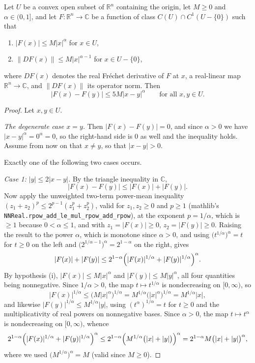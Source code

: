 \begin{lemma}
Let $U$ be a convex open subset of $\mathbb{R}^n$ containing the origin, let
$M\ge0$ and $\alpha\in(0,1]$, and let $F\colon\mathbb{R}^n\to\mathbb{C}$ be a
function of class $C(U)\cap C^1(U-\{0\})$ such that
\begin{enumerate}
\item[(i)] $|F(x)|\le M|x|^\alpha$ for $x\in U$,
\item[(ii)] $\|DF(x)\|\le M|x|^{\alpha-1}$ for $x\in U-\{0\}$,
\end{enumerate}
where $DF(x)$ denotes the real Fr\'echet derivative of $F$ at $x$, a
real-linear map $\mathbb{R}^n\to\mathbb{C}$, and $\|DF(x)\|$ its operator
norm.  Then
\[
  |F(x)-F(y)|\le5M|x-y|^\alpha\qquad\text{for all }x,y\in U .
\]
\end{lemma}
\begin{proof}
Let $x,y\in U$.

\emph{The degenerate case $x=y$.}  Then $|F(x)-F(y)|=0$, and since
$\alpha>0$ we have $|x-y|^\alpha=0^\alpha=0$, so the right-hand side is
$0$ as well and the inequality holds.  Assume from now on that $x\neq y$, so
that $|x-y|>0$.

Exactly one of the following two cases occurs.

\emph{Case 1: $|y|\le2|x-y|$.}  By the triangle inequality in $\mathbb{C}$,
\[
  |F(x)-F(y)|\le|F(x)|+|F(y)| .
\]
Now apply the unweighted two-term power-mean inequality
$(z_1+z_2)^{p}\le2^{p-1}(z_1^{p}+z_2^{p})$, valid for $z_1,z_2\ge0$ and
$p\ge1$ (mathlib's \texttt{NNReal.rpow\_add\_le\_mul\_rpow\_add\_rpow}), at the
exponent $p=1/\alpha$, which is $\ge1$ because $0<\alpha\le1$, and with
$z_1=|F(x)|\ge0$, $z_2=|F(y)|\ge0$.  Raising the result to the power $\alpha$,
which is monotone since $\alpha>0$, and using
$\bigl(t^{1/\alpha}\bigr)^{\alpha}=t$ for $t\ge0$ on the left and
$\bigl(2^{1/\alpha-1}\bigr)^{\alpha}=2^{1-\alpha}$ on the right, gives
\[
  |F(x)|+|F(y)|\le2^{1-\alpha}\Bigl(|F(x)|^{1/\alpha}+|F(y)|^{1/\alpha}\Bigr)^{\alpha}.
\]
By hypothesis (i), $|F(x)|\le M|x|^\alpha$ and $|F(y)|\le M|y|^\alpha$, all
four quantities being nonnegative.  Since $1/\alpha>0$, the map
$t\mapsto t^{1/\alpha}$ is nondecreasing on $[0,\infty)$, so
\[
  |F(x)|^{1/\alpha}\le\bigl(M|x|^\alpha\bigr)^{1/\alpha}
  =M^{1/\alpha}\bigl(|x|^{\alpha}\bigr)^{1/\alpha}=M^{1/\alpha}|x| ,
\]
and likewise $|F(y)|^{1/\alpha}\le M^{1/\alpha}|y|$, using
$(t^\alpha)^{1/\alpha}=t$ for $t\ge0$ and the multiplicativity of real powers
on nonnegative bases.  Since $\alpha>0$, the map $t\mapsto t^{\alpha}$ is
nondecreasing on $[0,\infty)$, whence
\[
  2^{1-\alpha}\Bigl(|F(x)|^{1/\alpha}+|F(y)|^{1/\alpha}\Bigr)^{\alpha}
  \le2^{1-\alpha}\Bigl(M^{1/\alpha}\bigl(|x|+|y|\bigr)\Bigr)^{\alpha}
  =2^{1-\alpha}M\bigl(|x|+|y|\bigr)^{\alpha},
\]
where we used $\bigl(M^{1/\alpha}\bigr)^{\alpha}=M$ (valid since $M\ge0$).


\end{proof}
